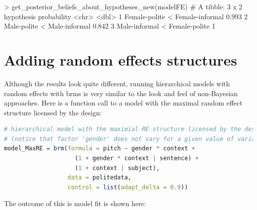 \documentclass[nobib]{tufte-handout}
\begin{document}
\medskip

\begin{minipage}[]{\textwidth}
\begin{rc}
> get_posterior_beliefs_about_hypotheses_new(modelFE)
# A tibble: 3 x 2
  hypothesis                      probability
  <chr>                                 <dbl>
1 Female-polite < Female-informal       0.993
2 Male-polite < Male-informal           0.842
3 Male-informal < Female-polite         1  
\end{rc}
\end{minipage}

\section{Adding random effects structures}

Although the results look quite different, running hierarchical models with random effects with \textrm{brms} is very similar to the look and feel of non-Bayesian approaches. Here is a function call to a model with the maximal random effect structure licensed by the design:

\begin{minipage}[]{1\textwidth}
\begin{lstlisting}[language=R]
# hierarchical model with the maximial RE structure licensed by the design
# (notice that factor 'gender' does not vary for a given value of variable 'subject')
model_MaxRE = brm(formula = pitch ~ gender * context +
                    (1 + gender * context | sentence) +
                    (1 + context | subject),
                  data = politedata,
                  control = list(adapt_delta = 0.9))
\end{lstlisting}
\end{minipage}

The outcome of this is model fit is shown here:

\medskip
\end{document}
